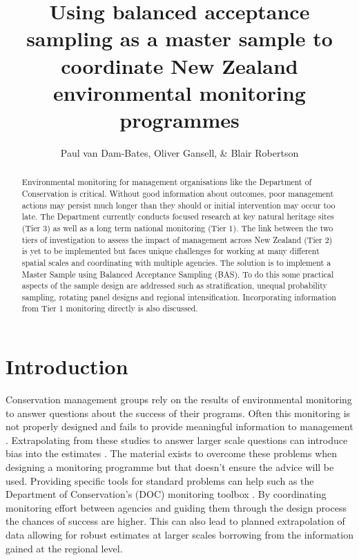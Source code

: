 \documentclass[]{article}
\title{Using balanced acceptance sampling as a master sample to coordinate New Zealand environmental monitoring programmes}
\author{Paul van Dam-Bates, Oliver Gansell, \& Blair Robertson}
\begin{document}
\maketitle

\begin{abstract}
Environmental monitoring for management organisations like the Department of Conservation is critical. Without good information about outcomes, poor management actions may persist much longer than they should or initial  intervention may occur too late. The Department currently conducts focused research at key natural heritage sites (Tier 3) as well as a long term national monitoring (Tier 1). The link between the two tiers of investigation to assess the impact of management across New Zealand (Tier 2) is yet to be implemented but faces unique challenges for working at many different spatial scales and coordinating with multiple agencies. The solution is to implement a Master Sample using Balanced Acceptance Sampling (BAS). To do this some practical aspects of the sample design are addressed such as stratification, unequal probability sampling, rotating panel designs and regional intensification. Incorporating information from Tier 1 monitoring directly is also discussed.
\end{abstract}

\section{Introduction}
Conservation management groups rely on the results of environmental monitoring to answer questions about the success of their programs. Often this monitoring is not properly designed and fails to provide meaningful information to management \cite{Legg2006, Nichols2006, Field2007}. Extrapolating from these studies to answer larger scale questions can introduce bias into the estimates \cite{Peterson1999}. The material exists to overcome these problems when designing a monitoring programme \cite{Gitzen2012, Reynolds2016, Vos2000} but that doesn't ensure the advice will be used. Providing specific tools for standard problems can help such as the Department of Conservation's (DOC) monitoring toolbox \cite{DOC}. By coordinating monitoring effort between agencies and guiding them through the design process the chances of success are higher. This can also lead to planned extrapolation of data allowing for robust estimates at larger scales borrowing from the information gained at the regional level.\\
\end{document}
